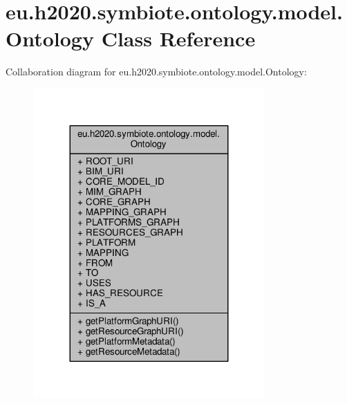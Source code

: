 \hypertarget{classeu_1_1h2020_1_1symbiote_1_1ontology_1_1model_1_1Ontology}{}\section{eu.\+h2020.\+symbiote.\+ontology.\+model.\+Ontology Class Reference}
\label{classeu_1_1h2020_1_1symbiote_1_1ontology_1_1model_1_1Ontology}


Collaboration diagram for eu.\+h2020.\+symbiote.\+ontology.\+model.\+Ontology\+:
\nopagebreak
\begin{figure}[H]
\begin{center}
\leavevmode
\includegraphics[width=251pt]{classeu_1_1h2020_1_1symbiote_1_1ontology_1_1model_1_1Ontology__coll__graph}
\end{center}
\end{figure}
